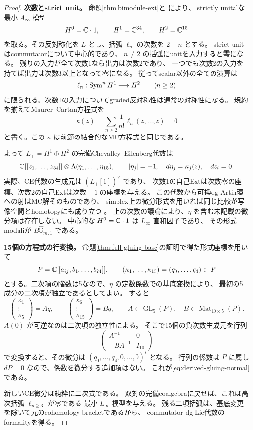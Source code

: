 \begin{proof}
\textbf{次数とstrict unit。}
命題\ref{thm:bimodule-ext}と
\cite[Theorem 11.8, Proposition 11.10, Theorem 7.2]{ELOII}により、
strictly unitalな最小 $A_\infty$ 模型
\[
 H^0=\mathbb C\cdot1,\qquad H^1=\mathbb C^{34},\qquad H^2=\mathbb C^{15}
\]
を取る。その反対称化を $L$ とし、括弧 $\ell_n$ の次数を $2-n$ とする。
strict unitはcommutatorについて中心的であり、
$n\ne2$ の括弧にunitを入力すると零になる。
残りの入力が全て次数1なら出力は次数2であり、
一つでも次数2の入力を持てば出力は次数3以上となって零になる。
従ってscalar以外の全ての演算は
\[
 \ell_n:\operatorname{Sym}^nH^1\longrightarrow H^2\qquad(n\ge2)
\]
に限られる。次数1の入力についてgraded反対称性は通常の対称性になる。
規約を揃えてMaurer--Cartan方程式を
\[
 \kappa(z)=\sum_{n\ge2}\frac1{n!}\ell_n(z,\ldots,z)=0
\]
と書く。この $\kappa$ は前節の結合的なMC方程式と同じである。

よって $L_+=H^1\oplus H^2$ の完備Chevalley--Eilenberg代数は
\begin{equation}\label{eq:derived-gluing-ce}
 \mathbb C[[z_1,\ldots,z_{34}]]\otimes\Lambda(\eta_1,\ldots,\eta_{15}),
 \qquad |\eta_j|=-1,\quad d\eta_j=\kappa_j(z),\quad dz_i=0.
\end{equation}
実際、CE代数の生成元は $(L_+[1])^\vee$ であり、
次数1の自己Extは次数零の座標、次数2の自己Extは次数 $-1$ の座標を与える。
この代数から可換dg Artin環への射はMC解そのものであり、
simplex上の微分形式を用いれば同じ比較が写像空間とhomotopyにも成り立つ
\cite[Proposition 1.1, Section 4]{Getzler}。
上の次数の議論により、$\eta$ を含む未記載の微分項は存在しない。
中心的な $H^0=\mathbb C\cdot1$ は $L_\infty$ 直和因子であり、
その形式moduliが $B\widehat{\mathbb G}_{m,1}$ である。

\textbf{15個の方程式の行変換。}
命題\ref{thm:full-gluing-base}の証明で得た形式座標を用いて
\[
 P=\mathbb C[[a_{ij},b_1,\ldots,b_{24}]],\qquad
 (\kappa_1,\ldots,\kappa_{15})=(q_0,\ldots,q_4)\subset P
\]
とする。二次項の階数は5なので、$\eta$ の定数係数での基底変換により、
最初の5成分の二次項が独立であるとしてよい。
すると
\[
 \begin{pmatrix}\kappa_1\\ \vdots\\ \kappa_5\end{pmatrix}=Aq,
 \qquad
 \begin{pmatrix}\kappa_6\\ \vdots\\ \kappa_{15}\end{pmatrix}=Bq,
 \qquad A\in\operatorname{GL}_5(P),\quad B\in\operatorname{Mat}_{10\times5}(P).
\]
$A(0)$ が可逆なのは二次項の独立性による。
そこで15個の負次数生成元を行列
\[
 \begin{pmatrix}A^{-1}&0\\-BA^{-1}&I_{10}\end{pmatrix}
\]
で変換すると、その微分は $(q_0,\ldots,q_4,0,\ldots,0)^t$ となる。
行列の係数は $P$ に属し $dP=0$ なので、係数を微分する追加項はない。
これが\eqref{eq:derived-gluing-normal}である。

新しいCE微分は純粋に二次式である。
双対の完備coalgebraに戻せば、これは高次括弧 $\ell_{n\ge3}$ が零である
最小 $L_\infty$ 模型を与える。
残る二項括弧は、基底変更を除いて元のcohomology bracketであるから、
commutator dg Lie代数のformalityを得る。
\end{proof}

